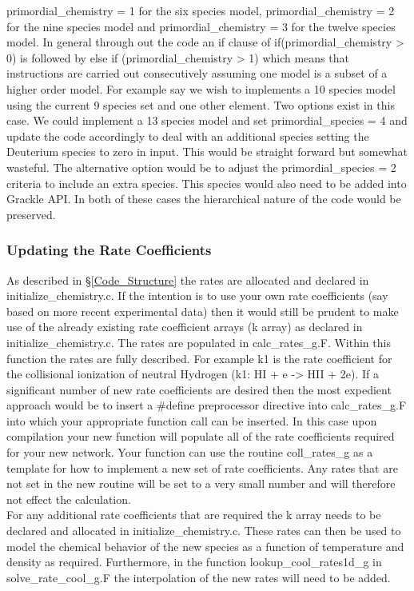 primordial\_chemistry = 1 for the six species model, primordial\_chemistry = 2 for the nine species model and
primordial\_chemistry = 3 for the twelve species model. In general through out the code an if clause of 
if(primordial\_chemistry > 0) is followed by else if (primordial\_chemistry > 1) which means that instructions
are carried out consecutively assuming one model is a subset of a higher order model.
For example say we wish to implements a 10 species model using the current 9 species set and one other element. 
Two options exist in this case. We could implement a 13 species model and set primordial\_species = 4 and 
update the code accordingly to deal with an additional species setting the Deuterium species to zero in input.
This would be straight forward but somewhat wasteful. The alternative option would be to adjust the 
primordial\_species = 2 criteria to include an extra species. This species would also need to be added into
Grackle API. In both of these cases the hierarchical nature of the code would be preserved. \\

\subsubsection{Updating the Rate Coefficients}
As described in \S \ref{Code_Structure} the rates are allocated and declared in initialize\_chemistry.c. If the
intention is to use your own rate coefficients (say based on more recent experimental data) then 
it would still be prudent to make use of the already existing rate coefficient arrays (k array) as declared
in initialize\_chemistry.c. The rates are populated in calc\_rates\_g.F. Within this function the rates 
are fully described. For example k1 is the rate coefficient for the collisional ionization of neutral 
Hydrogen (k1: HI + e -> HII + 2e). If a significant number of new rate coefficients are desired then 
the most expedient approach would be to insert a \#define preprocessor directive into calc\_rates\_g.F
into which your appropriate function call can be inserted. In this case upon compilation your new function 
will populate all of the rate coefficients required for your new network. Your function can use the 
routine coll\_rates\_g as a template for how to implement a new set of rate coefficients. Any rates that are not
set in the new routine will be set to a very small number and will therefore not effect the calculation.\\
\indent For any additional rate coefficients that are required the k array needs to be declared and allocated
in initialize\_chemistry.c. These rates can then be used to model the chemical behavior of the new species
as a function of temperature and density as required. Furthermore, in the function lookup\_cool\_rates1d\_g 
in solve\_rate\_cool\_g.F the interpolation of the new rates will need to be added. 


